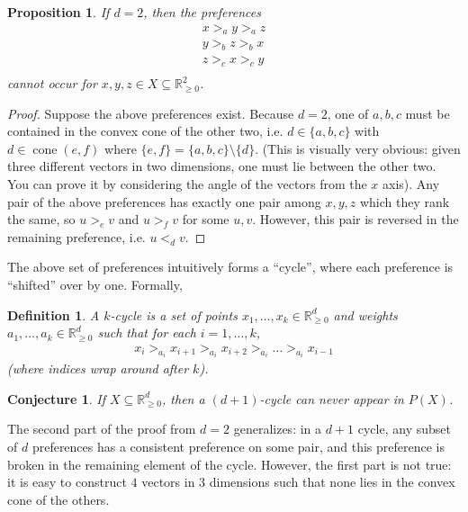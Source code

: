 \documentclass[12pt]{article}
\newtheorem*{definition}{Definition}
\newtheorem*{proposition}{Proposition}
\newtheorem*{conjecture}{Conjecture}
\newcommand{\Rgz}{\mathbb{R}_{\ge 0}}
\DeclareMathOperator*{\cone}{cone}
\newcommand{\1}[1]{\mathds{1}[{#1}]}
\begin{document}
  \begin{proposition}
    If $d=2$, then the preferences
    \begin{align*}
      x >_a y >_a z \\
      y >_b z >_b x\\
      z >_c x >_c y\\
    \end{align*}
    cannot occur for $x,y,z\in X\subseteq \Rgz^2$.
  \end{proposition}
  \begin{proof}
    Suppose the above preferences exist.
    Because $d=2$, one of $a,b,c$ must be contained in the
    convex cone of the other two, i.e. $d \in \{a,b,c\}$
    with $d \in \cone(e,f)$ where $\{e,f\} = \{a,b,c\} \setminus \{d\}$.
    (This is visually very obvious: given three different
    vectors in two dimensions, one must lie between the other two.
    You can prove it by considering the angle of the vectors from the $x$ axis).
    Any pair of the above preferences has exactly one pair
    among $x,y,z$ which they rank the same, so
    $u >_e v$ and $u >_f v$ for some $u,v$.
    However, this pair is reversed in the remaining preference, i.e. $u <_d v$.
  \end{proof}

  The above set of preferences intuitively forms a ``cycle'',
  where each preference is ``shifted'' over by one. Formally,
  \begin{definition}
    A $k$-cycle is a set of points $x_1,\ldots, x_k\in \Rgz^d$ and weights 
    $a_1,\ldots, a_k \in \Rgz^d$ such that for each $i=1,\ldots,k$,
    \begin{align*}
      x_i >_{a_i} x_{i+1} >_{a_i} x_{i+2} >_{a_i} \ldots >_{a_i} x_{i-1}
    \end{align*}
    (where indices wrap around after $k$).
  \end{definition}

  \begin{conjecture}
    If $X \subseteq \Rgz^d$, then a $(d+1)$-cycle can never appear in $P(X)$.
  \end{conjecture}

  The second part of the proof from $d=2$ generalizes:
  in a $d+1$ cycle, any subset of $d$ preferences has a consistent preference
  on some pair, and this preference is broken in the remaining
  element of the cycle.
  However, the first part is not true: it is easy to construct $4$ vectors in
  $3$ dimensions such that none lies in the convex cone of the others.
\end{document}
